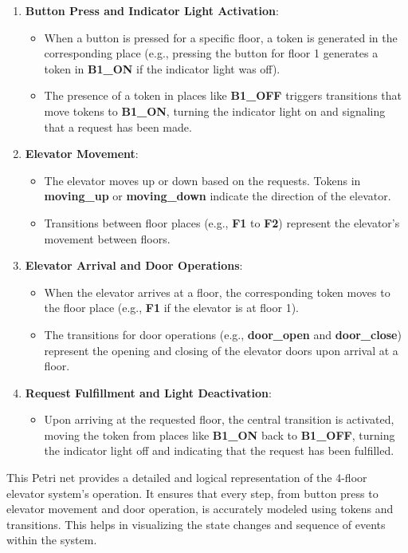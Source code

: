 \documentclass[12pt	]{article}
\begin{document}
\begin{enumerate}
	\item \textbf{Button Press and Indicator Light Activation}:
	\begin{itemize}
		\item When a button is pressed for a specific floor, a token is generated in the corresponding place (e.g., pressing the button for floor 1 generates a token in \textbf{B1\_ON} if the indicator light was off).
		\item The presence of a token in places like \textbf{B1\_OFF} triggers transitions that move tokens to \textbf{B1\_ON}, turning the indicator light on and signaling that a request has been made.
	\end{itemize}
	\item \textbf{Elevator Movement}:
	\begin{itemize}
		\item The elevator moves up or down based on the requests. Tokens in \textbf{moving\_up} or \textbf{moving\_down} indicate the direction of the elevator.
		\item Transitions between floor places (e.g., \textbf{F1} to \textbf{F2}) represent the elevator's movement between floors.
	\end{itemize}
	\item \textbf{Elevator Arrival and Door Operations}:
	\begin{itemize}
		\item When the elevator arrives at a floor, the corresponding token moves to the floor place (e.g., \textbf{F1} if the elevator is at floor 1).
		\item The transitions for door operations (e.g., \textbf{door\_open} and \textbf{door\_close}) represent the opening and closing of the elevator doors upon arrival at a floor.
	\end{itemize}
	\item \textbf{Request Fulfillment and Light Deactivation}:
	\begin{itemize}
		\item Upon arriving at the requested floor, the central transition is activated, moving the token from places like \textbf{B1\_ON} back to \textbf{B1\_OFF}, turning the indicator light off and indicating that the request has been fulfilled.
	\end{itemize}
\end{enumerate}


This Petri net provides a detailed and logical representation of the 4-floor elevator system's operation. It ensures that every step, from button press to elevator movement and door operation, is accurately modeled using tokens and transitions. This helps in visualizing the state changes and sequence of events within the system.
\end{document}
